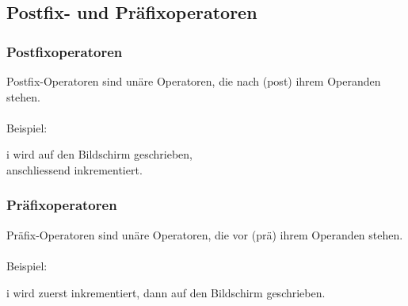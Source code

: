 	\begin{minipage}[t]{9 cm}	
		\subsection{Postfix- und Präfixoperatoren}
			\subsubsection{Postfixoperatoren}
				\begin{compactitem}
				 	\item Postfix-Operatoren sind unäre Operatoren, die nach (post) ihrem Operanden stehen.\\\\
				 	Beispiel:
				 	\vspace*{-0.2cm}
					
					\vspace*{0.1cm}
				 	i wird auf den Bildschirm geschrieben,\\ anschliessend inkrementiert.
				\end{compactitem}
			\subsubsection{Präfixoperatoren}
				\begin{compactitem}
					\item Präfix-Operatoren sind unäre Operatoren, die vor (prä) ihrem Operanden stehen.\\\\
					Beispiel:
					\vspace*{-0.2cm}
					
					\vspace*{0.1cm}
					i wird zuerst inkrementiert, dann auf den Bildschirm geschrieben.
				\end{compactitem}
		\end{minipage}
		\\\\
